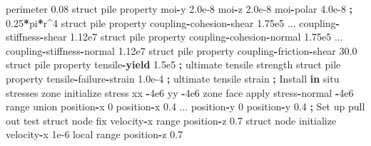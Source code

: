 \documentclass[a4paper, nobind]{templates/ociamthesis}
\newenvironment{Shaded}{\begin{snugshade}}{\end{snugshade}}
\newcommand{\BuiltInTok}[1]{#1}
\newcommand{\ControlFlowTok}[1]{\textcolor[rgb]{0.13,0.29,0.53}{\textbf{#1}}}
\newcommand{\DecValTok}[1]{\textcolor[rgb]{0.00,0.00,0.81}{#1}}
\newcommand{\FloatTok}[1]{\textcolor[rgb]{0.00,0.00,0.81}{#1}}
\newcommand{\KeywordTok}[1]{\textcolor[rgb]{0.13,0.29,0.53}{\textbf{#1}}}
\newcommand{\NormalTok}[1]{#1}
\newcommand{\OperatorTok}[1]{\textcolor[rgb]{0.81,0.36,0.00}{\textbf{#1}}}
\renewenvironment{Shaded}
{
  \vspace{10pt}%
  \begin{snugshade}%
}{%
  \end{snugshade}%
  \vspace{8pt}%
}
\begin{document}
\begin{Shaded}
\begin{Highlighting}[]
\NormalTok{                         perimeter }\FloatTok{0.08}
\NormalTok{    struct pile }\BuiltInTok{property}\NormalTok{ moi}\OperatorTok{{-}}\NormalTok{y }\FloatTok{2.0e{-}8}\NormalTok{ moi}\OperatorTok{{-}}\NormalTok{z }\FloatTok{2.0e{-}8}\NormalTok{ moi}\OperatorTok{{-}}\NormalTok{polar }\FloatTok{4.0e{-}8} \OperatorTok{;} \FloatTok{0.25}\OperatorTok{*}\NormalTok{pi}\OperatorTok{*}\NormalTok{r}\OperatorTok{\^{}}\DecValTok{4}
\NormalTok{    struct pile }\BuiltInTok{property}\NormalTok{ coupling}\OperatorTok{{-}}\NormalTok{cohesion}\OperatorTok{{-}}\NormalTok{shear }\FloatTok{1.75e5}\NormalTok{ ...}
\NormalTok{                         coupling}\OperatorTok{{-}}\NormalTok{stiffness}\OperatorTok{{-}}\NormalTok{shear }\FloatTok{1.12e7}
\NormalTok{    struct pile }\BuiltInTok{property}\NormalTok{ coupling}\OperatorTok{{-}}\NormalTok{cohesion}\OperatorTok{{-}}\NormalTok{normal }\FloatTok{1.75e5}\NormalTok{ ...}
\NormalTok{                         coupling}\OperatorTok{{-}}\NormalTok{stiffness}\OperatorTok{{-}}\NormalTok{normal }\FloatTok{1.12e7}
\NormalTok{    struct pile }\BuiltInTok{property}\NormalTok{ coupling}\OperatorTok{{-}}\NormalTok{friction}\OperatorTok{{-}}\NormalTok{shear }\FloatTok{30.0}
\NormalTok{    struct pile }\BuiltInTok{property}\NormalTok{ tensile}\OperatorTok{{-}}\ControlFlowTok{yield} \FloatTok{1.5e5}  \OperatorTok{;}\NormalTok{ ultimate tensile strength}
\NormalTok{    struct pile }\BuiltInTok{property}\NormalTok{ tensile}\OperatorTok{{-}}\NormalTok{failure}\OperatorTok{{-}}\NormalTok{strain }\FloatTok{1.0e{-}4} \OperatorTok{;}\NormalTok{ ultimate tensile strain}
    \OperatorTok{;}\NormalTok{ Install }\KeywordTok{in}\NormalTok{ situ stresses}
\NormalTok{    zone initialize stress xx }\OperatorTok{{-}}\FloatTok{4e6}\NormalTok{ yy }\OperatorTok{{-}}\FloatTok{4e6}
\NormalTok{    zone face }\BuiltInTok{apply}\NormalTok{ stress}\OperatorTok{{-}}\NormalTok{normal }\OperatorTok{{-}}\FloatTok{4e6} \BuiltInTok{range}\NormalTok{ union position}\OperatorTok{{-}}\NormalTok{x }\DecValTok{0}\NormalTok{ position}\OperatorTok{{-}}\NormalTok{x }\FloatTok{0.4}\NormalTok{ ...}
\NormalTok{                                                   position}\OperatorTok{{-}}\NormalTok{y }\DecValTok{0}\NormalTok{ position}\OperatorTok{{-}}\NormalTok{y }\FloatTok{0.4}
    \OperatorTok{;}\NormalTok{ Set up pull out test}
\NormalTok{    struct node fix velocity}\OperatorTok{{-}}\NormalTok{x }\BuiltInTok{range}\NormalTok{ position}\OperatorTok{{-}}\NormalTok{z }\FloatTok{0.7}
\NormalTok{    struct node initialize velocity}\OperatorTok{{-}}\NormalTok{x }\FloatTok{1e{-}6}\NormalTok{ local }\BuiltInTok{range}\NormalTok{ position}\OperatorTok{{-}}\NormalTok{z }\FloatTok{0.7}

\end{Highlighting}
\end{Shaded}
\end{document}
